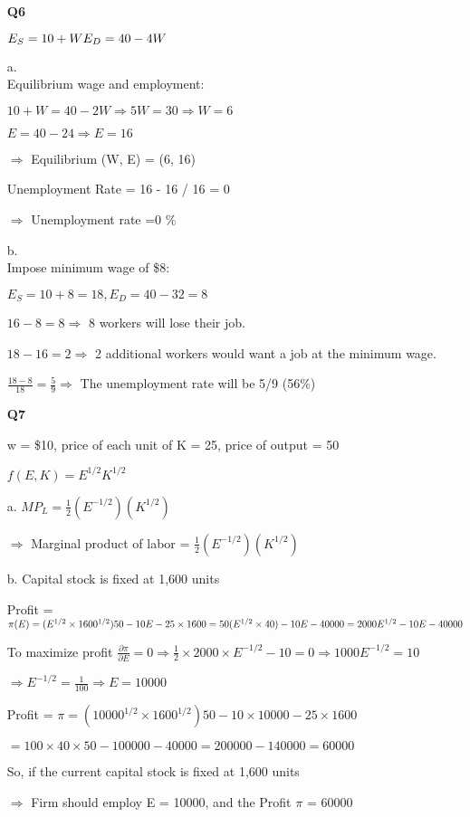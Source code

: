 \documentclass[12pt]{article}
\begin{document}
\begin{enumerate}
    \item[\textbf{Q6}] 

    $E_S = 10 + W\\ E_D = 40 - 4W$

    a.\\ Equilibrium wage and employment:
    
    $10 + W = 40 - 2W \Rightarrow 5W = 30 \Rightarrow W = 6$

    $E = 40 - 24 \Rightarrow E = 16$

    $\Rightarrow$ Equilibrium (W, E) = (6, 16)

    Unemployment Rate = 16 - 16 / 16 = 0 

    $\Rightarrow$ Unemployment rate =0 \%

    b.\\ Impose minimum wage of \$8:

    $E_S = 10 + 8 = 18, E_D = 40 - 32 = 8$

    $16 - 8 = 8 \Rightarrow$ 8 workers will lose their job.

    $18 - 16 = 2 \Rightarrow$ 2 additional workers would want a job at the minimum wage.

    $\frac{18 - 8}{18} = \frac{5}{9} \Rightarrow$ The unemployment rate will be 5/9 (56\%)
    
    \item[\textbf{Q7}]

    w = \$10, price of each unit of K = 25, price of output = 50

    $f(E, K) = E^{1/2}K^{1/2}$

    a. $MP_L = \frac{1}{2}(E^{-1/2})(K^{1/2})$
    
    $\Rightarrow$ Marginal product of labor = $\frac{1}{2}(E^{-1/2})(K^{1/2})$

    b. Capital stock is fixed at 1,600 units

    Profit = $\pi(E) = (E^{1/2} \times 1600^{1/2})50 - 10E - 25 \times 1600 = 50(E^{1/2} \times 40) - 10E - 40000\\ = 2000E^{1/2} - 10E - 40000$
    
    To maximize profit $\frac{\partial \pi}{\partial E} = 0 \Rightarrow \frac{1}{2} \times 2000 \times E^{-1/2} - 10 = 0 \Rightarrow 1000E^{-1/2} = 10$
    
    $\Rightarrow E^{-1/2} = \frac{1}{100} \Rightarrow E = 10000$  

    Profit = $\pi = (10000^{1/2} \times 1600^{1/2})50 - 10 \times 10000 - 25 \times 1600$

    $= 100 \times 40 \times 50 - 100000 - 40000 = 200000 - 140000 = 60000$
    \newline 

    So, if the current capital stock is fixed at 1,600 units
    
    $\Rightarrow$ Firm should employ E = 10000, and the Profit $\pi$ = 60000
    
\end{enumerate}
\end{document}
